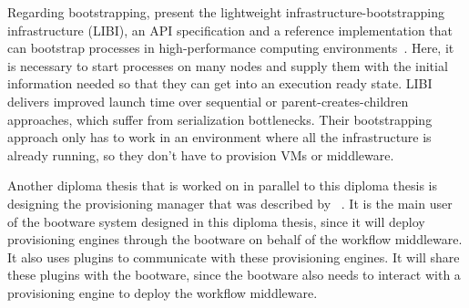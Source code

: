 Regarding bootstrapping, \citeauthor*{libi} present the lightweight infrastructure-bootstrapping infrastructure (LIBI), an API specification and a reference implementation that can bootstrap processes in high-performance computing environments~\autocite{libi}.
Here, it is necessary to start processes on many nodes and supply them with the initial information needed so that they can get into an execution ready state.
LIBI delivers improved launch time over sequential or parent-creates-children approaches, which suffer from serialization bottlenecks.
Their bootstrapping approach only has to work in an environment where all the infrastructure is already running, so they don't have to provision VMs or middleware.

Another diploma thesis that is worked on in parallel to this diploma thesis is designing the provisioning manager that was described by \citeauthor*{provisioning:dynamic}~\autocite{nedim}.
It is the main user of the bootware system designed in this diploma thesis, since it will deploy provisioning engines through the bootware on behalf of the workflow middleware.
It also uses plugins to communicate with these provisioning engines.
It will share these plugins with the bootware, since the bootware also needs to interact with a provisioning engine to deploy the workflow middleware.
